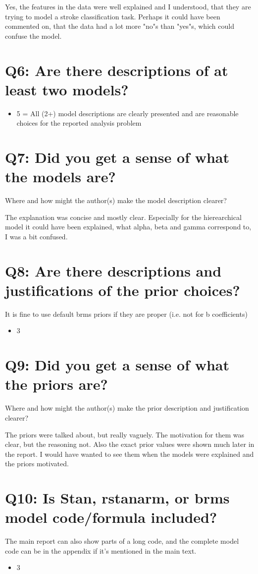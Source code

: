 \documentclass[11pt,a4paper]{article}
\begin{document}
Yes, the features in the data were well explained and I understood, that they are trying to model a stroke classification task. Perhaps it could have been commented on, that the data had a lot more "no"s than "yes"s, which could confuse the model.

\section{Q6: Are there descriptions of at least two models?}
\begin{itemize}
    \item 5 = All (2+) model descriptions are clearly presented and are reasonable choices for the reported analysis problem
\end{itemize}

\section{Q7: Did you get a sense of what the models are?}
Where and how might the author(s) make the model description clearer?

The explanation was concise and mostly clear. Especially for the hierearchical model it could have been explained, what alpha, beta and gamma correspond to, I was a bit confused.

\section{Q8: Are there descriptions and justifications of the prior choices?}
It is fine to use default brms priors if they are proper (i.e. not for b coefficients)
\begin{itemize}
    \item 3
\end{itemize}

\section{Q9: Did you get a sense of what the priors are?}
Where and how might the author(s) make the prior description and justification clearer?

The priors were talked about, but really vaguely. The motivation for them was clear, but the reasoning not. Also the exact prior values were shown much later in the report. I would have wanted to see them when the models were explained and the priors motivated.

\section{Q10: Is Stan, rstanarm, or brms model code/formula included?}
The main report can also show parts of a long code, and the complete model code can be in the appendix if it's mentioned in the main text.
\begin{itemize}
    \item 3
\end{itemize}
\end{document}
